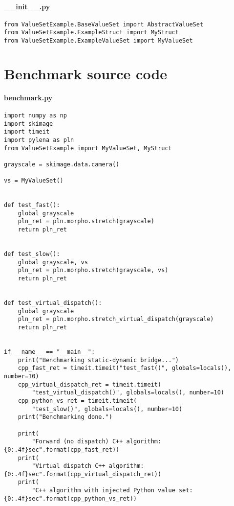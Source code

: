 \paragraph{\_\_init\_\_.py}

\begin{verbatim}
from ValueSetExample.BaseValueSet import AbstractValueSet
from ValueSetExample.ExampleStruct import MyStruct
from ValueSetExample.ExampleValueSet import MyValueSet
\end{verbatim}


\clearpage

\section{Benchmark source code}
\label{appendix:static-dynamic-bridge.benchmark}

\paragraph{benchmark.py}

\begin{verbatim}
import numpy as np
import skimage
import timeit
import pylena as pln
from ValueSetExample import MyValueSet, MyStruct

grayscale = skimage.data.camera()

vs = MyValueSet()


def test_fast():
    global grayscale
    pln_ret = pln.morpho.stretch(grayscale)
    return pln_ret


def test_slow():
    global grayscale, vs
    pln_ret = pln.morpho.stretch(grayscale, vs)
    return pln_ret


def test_virtual_dispatch():
    global grayscale
    pln_ret = pln.morpho.stretch_virtual_dispatch(grayscale)
    return pln_ret


if __name__ == "__main__":
    print("Benchmarking static-dynamic bridge...")
    cpp_fast_ret = timeit.timeit("test_fast()", globals=locals(), number=10)
    cpp_virtual_dispatch_ret = timeit.timeit(
        "test_virtual_dispatch()", globals=locals(), number=10)
    cpp_python_vs_ret = timeit.timeit(
        "test_slow()", globals=locals(), number=10)
    print("Benchmarking done.")

    print(
        "Forward (no dispatch) C++ algorithm: {0:.4f}sec".format(cpp_fast_ret))
    print(
        "Virtual dispatch C++ algorithm: {0:.4f}sec".format(cpp_virtual_dispatch_ret))
    print(
        "C++ algorithm with injected Python value set: {0:.4f}sec".format(cpp_python_vs_ret))
\end{verbatim}
